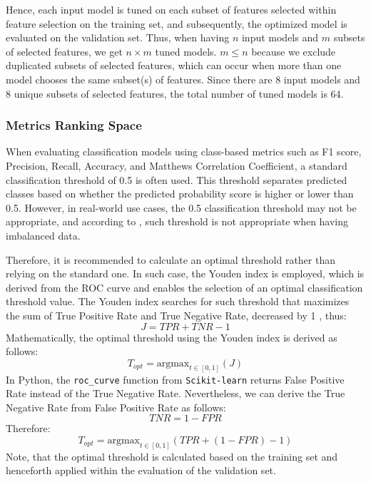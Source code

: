 \vspace{-1em}
Hence, each input model is tuned on each subset of features selected within feature selection on the training set, and subsequently, the optimized model is evaluated on the validation set. Thus, when having $n$ input models and $m$ subsets of selected features, we get $n \times m$ tuned models.
$m \leq n$ because we exclude duplicated subsets of selected features, which can occur when more than one model chooses the same subset(s) of features.
Since there are 8 input models and 8 unique subsets of selected features, the total number of tuned models is 64.

\subsubsection{Metrics Ranking Space}

When evaluating classification models using class-based metrics such as F1 score, Precision, Recall, Accuracy, and Matthews Correlation Coefficient, a standard classification threshold of 0.5 is often used. This threshold separates predicted classes based on whether the predicted probability score is higher or lower than 0.5.
However, in real-world use cases, the 0.5 classification threshold may not be appropriate, and according to \citep{esposito2021ghost}, such threshold is not appropriate when having imbalanced data.

Therefore, it is recommended to calculate an optimal threshold rather than relying on the standard one.
In such case, the Youden index is employed, which is derived from the ROC curve and enables the selection of an optimal classification threshold value.
The Youden index searches for such threshold that maximizes the sum of True Positive Rate and True Negative Rate, decreased by 1 \citep{fluss2005estimation}, thus:
\begin{equation}\label{eq}
J = TPR + TNR - 1
\end{equation}
Mathematically, the optimal threshold using the Youden index is derived as follows:
\begin{equation}\label{eq}
T_{opt} = \text{argmax}_{t \in [0, 1]}\left(J\right)
\end{equation}
In Python, the \lstinline{roc_curve} function from \lstinline{Scikit-learn} returns False Positive Rate instead of the True Negative Rate. Nevertheless, we can derive the True Negative Rate from False Positive Rate as follows:
\begin{equation}\label{eq}
TNR =  1-FPR
\end{equation}
Therefore:
\begin{equation}\label{eq:youden}
T_{opt} = \text{argmax}_{t \in [0, 1]}\left(TPR +  \left(1-FPR\right) - 1\right)
\end{equation}
Note, that the optimal threshold is calculated based on the training set and henceforth applied within the evaluation of the validation set.

